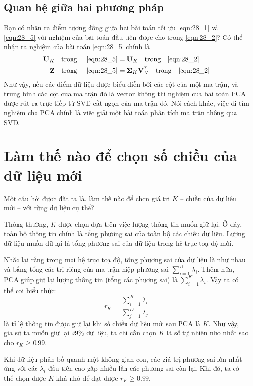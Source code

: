 \subsection{Quan hệ giữa hai phương pháp}
Bạn có nhận ra điểm tương đồng giữa hai bài toán tối ưu \eqref{eqn:28_1} và \eqref{eqn:28_5} với nghiệm của bài toán đầu tiên được cho trong \eqref{eqn:28_2}? Có thể nhận ra nghiệm của bài toán \eqref{eqn:28_5} chính là
\begin{align*}
\mathbf{U}_K \quad \text{trong}\quad~\eqref{eqn:28_5} &= \mathbf{U}_K \quad\text{trong} \quad
\eqref{eqn:28_2} \\\
\mathbf{Z} \quad\text{trong}\quad~\eqref{eqn:28_5} &= \mathbf{\Sigma}_K \mathbf{V}_K^T \quad\text{trong} \quad \eqref{eqn:28_2}
\end{align*}
Như vậy, nếu các điểm dữ liệu được biểu diễn bởi các cột của một ma trận, và
trung bình các cột của ma trận đó là vector không thì nghiệm của bài toán PCA được rút ra trực tiếp từ SVD cắt ngọn của
ma trận đó. Nói cách khác, việc đi tìm nghiệm cho PCA chính là việc giải một
bài toán phân tích ma trận thông qua SVD.


\section{Làm thế nào để chọn số chiều của dữ liệu mới}

Một câu hỏi được đặt ra là, làm thế nào để chọn giá trị $K$  --  chiều của dữ
liệu mới  --  với từng dữ liệu cụ thể?

Thông thường, $K$ được chọn dựa trên việc {lượng thông tin muốn giữ lại}. Ở đây, toàn bộ thông tin chính là tổng phương sai của toàn bộ các chiều dữ liệu. Lượng dữ liệu muốn dữ lại là tổng phương sai của dữ liệu trong hệ trục toạ độ mới.

Nhắc lại rằng trong mọi hệ trục toạ độ, tổng phương sai của dữ liệu là như nhau
và bằng tổng các trị riêng của ma trận hiệp phương sai $\sum_{i=1}^D
\lambda_i$. Thêm nữa, PCA giúp giữ lại lượng thông tin (tổng các phương sai) là
$\sum_{i=1}^K \lambda_i$. Vậy ta có thể coi biểu thức:
\begin{equation}
\label{eqn:28_6}
r_K = \frac{\sum_{i=1}^K \lambda_i}{\sum_{j=1}^D \lambda_j}
\end{equation}
là tỉ lệ thông tin được giữ lại khi số chiều dữ liệu mới sau PCA là $K$. Như
vậy, giả sử ta muốn giữ lại 99\% dữ liệu, ta chỉ cần chọn $K$ là số tự nhiên
nhỏ nhất sao cho $r_K \geq 0.99$.

Khi dữ liệu phân bố quanh một không gian con, các giá trị phương sai lớn nhất
ứng với các $\lambda_i$ đầu tiên cao gấp nhiều lần các phương sai còn lại.
Khi đó, ta có thể chọn được $K$ khá nhỏ để đạt được $r_K \geq 0.99$.


